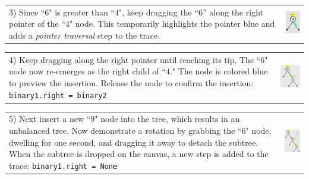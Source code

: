 \noindent \begin{tabular}{m{6.2cm} m{1.8cm}}

3) Since ``6" is greater than ``4", keep dragging the ``6'' along the
right pointer of the ``4" node. This temporarily highlights the pointer
blue and adds a \emph{pointer traversal} step to the trace.

& \includegraphics[width=1.8cm]{img/examples/bst-3.png}
\end{tabular}

\noindent \begin{tabular}{m{4.6cm} m{3.4cm}}

4) Keep dragging along the right pointer until reaching its tip. The
``6" node now re-emerges as the right child of ``4." The node is colored blue to
preview the insertion. Release the node to confirm the insertion:
\texttt{binary1.right = binary2}

& \includegraphics[width=3.4cm]{img/examples/bst-4.png}
\end{tabular}

\noindent \begin{tabular}{m{4.6cm} m{3.4cm}}

5) Next insert a new ``9" node into the tree, which results in an
unbalanced tree. Now demonstrate a rotation by grabbing the ``6" node,
dwelling for one second, and dragging it away to detach the subtree.
When the subtree is dropped on the canvas, a new step is added to the
trace: \texttt{binary1.right = None}

& \includegraphics[width=3.4cm]{img/examples/bst-5.png}
\end{tabular}

